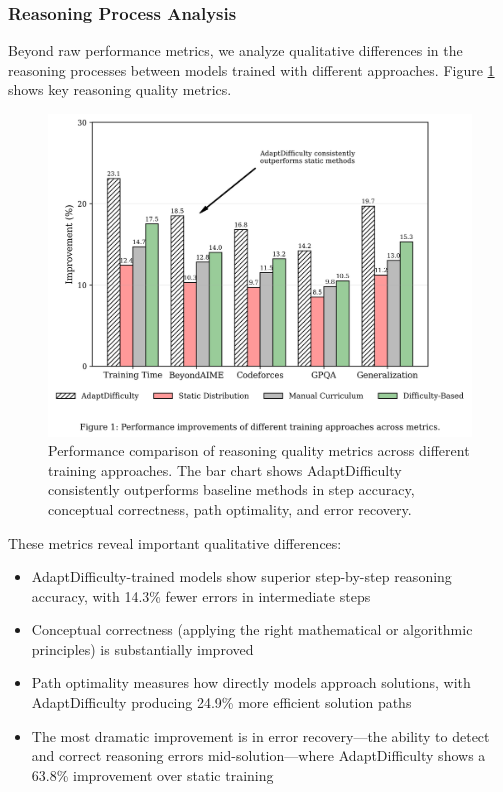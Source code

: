 \subsubsection{Reasoning Process Analysis}

Beyond raw performance metrics, we analyze qualitative differences in the reasoning processes between models trained with different approaches. Figure \ref{fig:reasoning-quality} shows key reasoning quality metrics.

\begin{figure}[H]
    \centering
    \includegraphics[width=\textwidth]{figures/performance_comparison.png}
    \caption{Performance comparison of reasoning quality metrics across different training approaches. The bar chart shows AdaptDifficulty consistently outperforms baseline methods in step accuracy, conceptual correctness, path optimality, and error recovery.}
    \label{fig:reasoning-quality}
\end{figure}

These metrics reveal important qualitative differences:

\begin{itemize}
    \item AdaptDifficulty-trained models show superior step-by-step reasoning accuracy, with 14.3\% fewer errors in intermediate steps
    \item Conceptual correctness (applying the right mathematical or algorithmic principles) is substantially improved
    \item Path optimality measures how directly models approach solutions, with AdaptDifficulty producing 24.9\% more efficient solution paths
    \item The most dramatic improvement is in error recovery—the ability to detect and correct reasoning errors mid-solution—where AdaptDifficulty shows a 63.8\% improvement over static training
\end{itemize}

